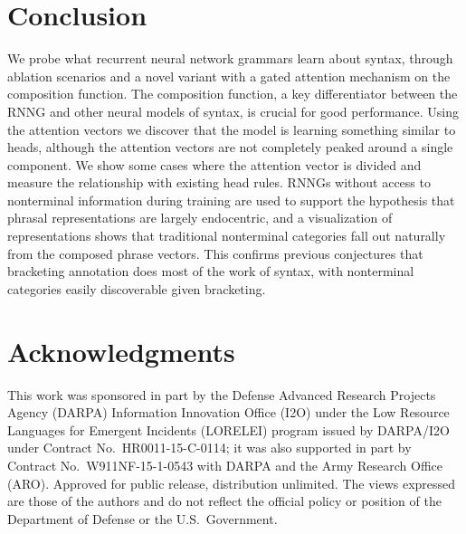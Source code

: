 \documentclass[11pt]{article}
\begin{document}
\section{Conclusion}\label{sec:conclusion}
We probe what recurrent neural network grammars learn about syntax, through ablation scenarios and a novel variant with a gated attention mechanism on the composition function. The composition function, a key differentiator between the RNNG and other neural models of syntax, is crucial for good performance. Using the attention vectors we discover that the model is learning something similar to heads, although the attention vectors are not completely peaked around a single component. We show some cases where the attention vector is divided and measure the relationship with existing head rules. RNNGs without access to nonterminal information during training are used to support the hypothesis that phrasal representations are largely endocentric, and a visualization of representations shows that traditional nonterminal categories fall out naturally from the composed phrase vectors. This confirms previous conjectures that bracketing annotation does most of the work of syntax, with nonterminal categories easily discoverable given bracketing.

\section*{Acknowledgments}\begin{small}
This work was sponsored in part by the Defense Advanced Research Projects Agency (DARPA)
Information Innovation Office (I2O) under the Low Resource Languages for Emergent Incidents (LORELEI) program issued by DARPA/I2O under Contract No.~HR0011-15-C-0114;
it was also supported in part by Contract No.~W911NF-15-1-0543 with DARPA and the Army Research Office (ARO). Approved for public release, distribution unlimited. The views expressed are those of the authors and do not reflect the official policy or position of the Department of Defense or the U.S.~Government.

\end{small}




\appendix
\end{document}
